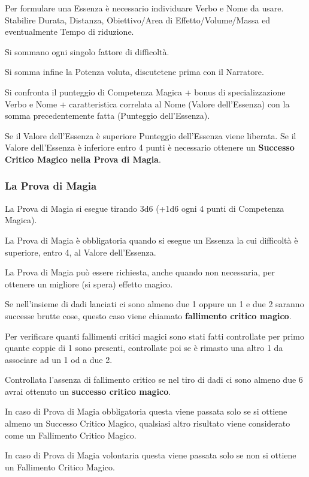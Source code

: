 \documentclass[a4paper,twoside,openany]{book}
\begin{document}
\begin{multicols}{2}
Per formulare una Essenza è necessario individuare Verbo e Nome da usare.
Stabilire Durata, Distanza, Obiettivo/Area di Effetto/Volume/Massa ed eventualmente Tempo di riduzione.

Si sommano ogni singolo fattore di difficoltà.

Si somma infine la Potenza voluta, discutetene prima con il Narratore.

Si confronta il punteggio di Competenza Magica + bonus di specializzazione Verbo e Nome + caratteristica correlata al Nome  (Valore dell'Essenza) con la somma precedentemente fatta (Punteggio dell'Essenza).

Se il Valore dell'Essenza è superiore Punteggio dell'Essenza viene liberata. Se il Valore dell'Essenza è inferiore entro 4 punti è necessario ottenere un \textbf{Successo Critico Magico nella Prova di Magia}.

\subsubsection{La Prova di Magia}

La Prova di Magia si esegue tirando 3d6 (+1d6 ogni 4 punti di Competenza Magica).

La Prova di Magia è obbligatoria quando si esegue un Essenza la cui difficoltà è superiore, entro 4, al Valore dell'Essenza.

La Prova di Magia può essere richiesta, anche quando non necessaria, per ottenere un migliore (si spera) effetto magico.

Se nell'insieme di dadi lanciati ci sono almeno due 1 oppure un 1 e due 2 saranno successe brutte cose, questo caso viene chiamato \textbf{fallimento critico magico}.

Per verificare quanti fallimenti critici magici sono stati fatti controllate per primo quante coppie di 1 sono presenti, controllate poi se è rimasto una altro 1 da associare ad un 1 od a due 2.

Controllata l'assenza di fallimento critico se nel tiro di dadi ci sono almeno due 6 avrai ottenuto un \textbf{successo critico magico}.

In caso di Prova di Magia obbligatoria questa viene passata solo se si ottiene almeno un Successo Critico Magico, qualsiasi altro risultato viene considerato come un Fallimento Critico Magico.

In caso di Prova di Magia volontaria questa viene passata solo se non si ottiene un Fallimento Critico Magico.


\end{multicols}
\end{document}
